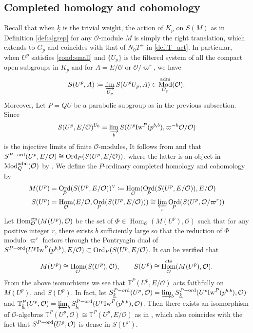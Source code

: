 \documentclass[leqno]{amsart}
\newcommand{\wt}[1]{\underline{ #1 }}
\newcommand{\TT}{\mathbb{T}} %
\newcommand{\Iw}{\textnormal{Iw}}
\newcommand{\aMod}{\textnormal{Mod}^{\textnormal{adm}}}
\DeclareMathOperator{\Mod}{\textnormal{Mod}}
\DeclareMathOperator{\Ord}{Ord}
\newcommand{\cts}{\textnormal{cts}}
\newcommand{\adm}{\textnormal{adm}}
\newcommand{\ord}{\textnormal{ord}}
\newcommand{\oo}{\mathcal{O}} %
\DeclareMathOperator{\Hom}{Hom}
\theoremstyle{definition}
\theoremstyle{remark}
\begin{document}
\subsection{Completed homology and cohomology}

Recall that when $\wt{k}$ is the trivial weight,
the action of $K_p$
on  $S(M)$ as in Definition \ref{def:algrep} 
for any  $\oo$-module $M$
is simply the right translation,
which extends to $G_p$
and coincides with that of $N_0T^+$ in \eqref{def:T_act}.
In particular,
when $U^p$ satisfies \eqref{cond:small}
and $\{U_p\}$ is the filtered system of 
all the compact open subgroups in $K_p$
and for $A=E/\oo$ or  $\oo/\varpi^{r}$, we have
\begin{equation}\label{eq:complete}
	S(U^p,A)\coloneqq
	\varinjlim_{U_p}S(U^pU_p,A)\in 
	\Mod^{\adm}_{G_p}(\oo).
\end{equation}
Moreover, Let $P=QU$ be a parabolic subgroup 
as in the previous subsection.
Since 
\[
	S(U^p,E/\oo)^{U_0}=
	\varinjlim_{b}
	S(U^p\Iw^P(p^{b,b}),\varpi^{-b}\oo/\oo)
\]
is the injective limits of finite $\oo$-modules,
It follows from \cite[Lem 3.1.5]{emeI} and \cite[Prop 3.2.4]{emeI}
that $S^{P-\ord}(U^p,E/\oo)\cong \Ord_P(S(U^p,E/\oo))$,
where the latter is an object in $\aMod_Q(\oo)$
by \cite[Thm 3.3.3]{emeI}.
We define the $P$-ordinary completed homology and cohomology by
\begin{align}\label{eq:completed_coh}
	M(U^p)&=
	\Ord_P(S(U^p,E/\oo))^\vee
	\coloneqq \Hom_\oo(\Ord_P(S(U^p,E/\oo)),E/\oo)\\
	S(U^p)&=\Hom_\oo(E/\oo, \Ord_P(S(U^p,E/\oo)))
	\cong \varprojlim_r \Ord_P(S(U^p,\oo/\varpi^{r}))
\end{align}
Let $\Hom_\oo^{\cts}(M(U^p),\oo)$
be the set of
$\Phi\in \Hom_\oo(M(U^p),\oo)$ 
such that for any positive integer $r$,
there exists $b$ sufficiently large so that 
the reduction of $\Phi$ modulo $\varpi^r$
factors through
the Pontryagin dual of 
$S^{P-\ord}(U^p\Iw^P(p^{b,b}),E/\oo)\subset \Ord_P(S(U^p,E/\oo)$. 
It can be verified that 
\[
	M(U^p)\cong \Hom_\oo(S(U^p),\oo),\qquad
	S(U^p)\cong \Hom_\oo^{\cts}(M(U^p),\oo).
\]
From the above isomorhisms we see that
$\TT^P(U^p,E/\oo)$ acts faithfully
on  $M(U^p)$, and  $S(U^p)$.
In fact, 
let $S_{\wt{k}}^{P-\ord}(U^p,\oo)
=\varinjlim_{b}S_{\wt{k}}^{P-\ord}(U^p\Iw^P(p^{b,b}),\oo)$
and 
$\TT^P_{\wt{k}}(U^p,\oo)=\varprojlim_bS_{\wt{k}}^{P-\ord}(U^p\Iw^P(p^{b,b}),\oo)$.
Then there exists an isomorphism of $\oo$-algebras 
$\TT^P(U^p,\oo)\cong \TT^P(U^p,E/\oo)$
as in \cite[Lem 2.17]{ger},
which also coincides with the fact that
$S^{P-\ord}(U^p,\oo)$ is dense in $S(U^p)$.
\end{document}
